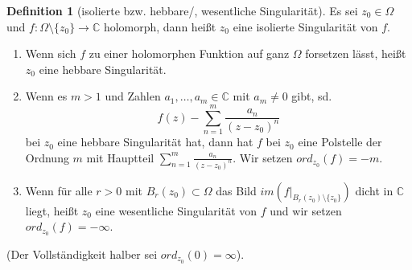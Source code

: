 \documentclass[11pt,titlepage]{article}
\theoremstyle{definition}
\newtheorem{definition}[theorem]{Definition}
\theoremstyle{remark}
\begin{document}
	\begin{definition}[isolierte bzw. hebbare/, wesentliche Singularität]
		Es sei $z_0\in\Omega$ und $f:\Omega\setminus\{z_0\}\to\mathbb{C}$ holomorph, dann heißt 
		$z_0$ eine isolierte Singularität von $f$.
		\begin{enumerate}
			\item Wenn sich $f$ zu einer holomorphen Funktion auf ganz  $\Omega$ forsetzen lässt, 
			heißt $z_0$ eine hebbare Singularität.
			\item Wenn es $m>1$ und Zahlen $a_1 ,\ldots ,a_m \in\mathbb{C}$ mit $a_m \neq 0$ gibt, 
			sd. \[f(z)-\sum_{n=1}^m \frac{a_n}{(z-z_0)^n} \] bei $z_0$ eine hebbare Singularität hat, 
			dann hat $f$ bei $z_0$ eine Polstelle der Ordnung $m$ mit Hauptteil 
			$\sum_{n=1}^m \frac{a_n}{(z-z_0)^n}$. Wir setzen $ord_{z_0}(f)=-m$.
			\item Wenn für alle $r>0$ mit $B_r (z_0)\subset\Omega$ das Bild 
			$im (f|_{B_r(z_0)\setminus\{z_0\}})$ dicht in $\mathbb{C}$ liegt, heißt $z_0$ eine 
			wesentliche Singularität von $f$ und wir setzen $ord_{z_0}(f)=-\infty$.
		\end{enumerate}
		(Der Vollständigkeit halber sei $ord_{z_0}(0)=\infty$).
	\end{definition}
	
\end{document}
